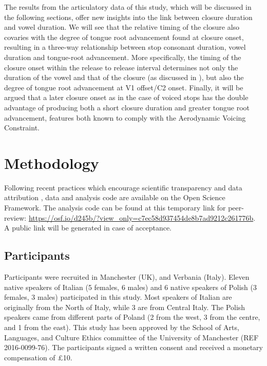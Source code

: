 \documentclass[preprint]{JASAnew}
\begin{document}
The results from the articulatory data of this study, which will be
discussed in the following sections, offer new insights into the link
between closure duration and vowel duration. We will see that the
relative timing of the closure also covaries with the degree of tongue
root advancement found at closure onset, resulting in a three-way
relationship between stop consonant duration, vowel duration and
tongue-root advancement. More specifically, the timing of the closure
onset within the release to release interval determines not only the
duration of the vowel and that of the closure (as discussed in
\citealt{coretta2019k}), but also the degree of tongue root advancement
at V1 offset/C2 onset. Finally, it will be argued that a later closure
onset as in the case of voiced stops has the double advantage of
producing both a short closure duration and greater tongue root
advancement, features both known to comply with the Aerodynamic Voicing
Constraint.

\hypertarget{methodology}{%
\section{Methodology}\label{methodology}}

Following recent practices which encourage scientific transparency and
data attribution \citep{cruwell2018, berez-kroeker2018, roettger2019},
data \citep{coretta2018m} and analysis code are available on the Open
Science Framework. The analysis code can be found at this temporary link
for peer-review:
\url{https://osf.io/d245b/?view_only=c7ec58d937454de8b7ad9212c261776b}.
A public link will be generated in case of acceptance.

\hypertarget{participants}{%
\subsection{Participants}\label{participants}}

Participants were recruited in Manchester (UK), and Verbania (Italy).
Eleven native speakers of Italian (5 females, 6 males) and 6 native
speakers of Polish (3 females, 3 males) participated in this study. Most
speakers of Italian are originally from the North of Italy, while 3 are
from Central Italy. The Polish speakers came from different parts of
Poland (2 from the west, 3 from the centre, and 1 from the east). This
study has been approved by the School of Arts, Languages, and Culture
Ethics committee of the University of Manchester (REF 2016-0099-76). The
participants signed a written consent and received a monetary
compensation of £10.
\end{document}

